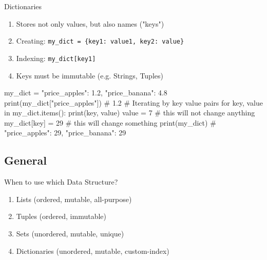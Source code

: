 \begin{frame}[fragile]{Dictionaries}

    \begin{enumerate}
		\item Stores not only values, but also names ("keys")
		\item Creating: \texttt{my\_dict = \{key1: value1, key2: value\}}
		\item Indexing: \texttt{my\_dict[key1]}
		\item Keys must be immutable (e.g. Strings, Tuples)
    \end{enumerate}

	\vspace{1em}

	\begin{pythoncode}
my_dict = {"price_apples": 1.2, "price_banana": 4.8}
print(my_dict["price_apples"]) # 1.2
# Iterating by key value pairs
for key, value in my_dict.items():
	print(key, value)
	value = 7 # this will not change anything
	my_dict[key] = 29 # this will change something
print(my_dict) # {"price_apples": 29, "price_banana": 29}

	\end{pythoncode}

\end{frame}

\subsection*{General}

\begin{frame}{When to use which Data Structure?}

    \begin{enumerate}
		\item Lists         (ordered, mutable, all-purpose)
		\item Tuples        (ordered, immutable)
		\item Sets          (unordered, mutable, unique)
		\item Dictionaries  (unordered, mutable, custom-index)
    \end{enumerate}

\end{frame}


